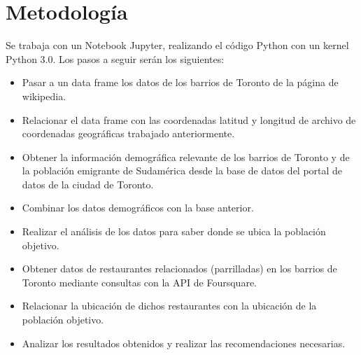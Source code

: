 \documentclass[11pt,a4paper,sans, spanish]{article}
\begin{document}
\section{Metodología}
Se trabaja con un Notebook Jupyter, realizando el código Python con un kernel Python 3.0.
Los pasos a seguir serán los siguientes:
\begin{itemize}
	\item Pasar a un data frame los datos de los barrios de Toronto de la página de wikipedia.
	\item Relacionar el data frame con las coordenadas latitud y longitud de archivo de coordenadas geográficas trabajado anteriormente.
	\item Obtener la información demográfica relevante de los barrios de Toronto y de la población emigrante de Sudamérica  desde  la base de datos del portal de datos de la ciudad de Toronto.
	\item Combinar los datos demográficos con la base anterior.
	\item Realizar el análisis de los datos para saber donde se ubica la población objetivo.
	\item Obtener datos de restaurantes relacionados (parrilladas) en los barrios de Toronto mediante consultas con la API de Foursquare.
	\item Relacionar la ubicación de dichos restaurantes con la ubicación de la población objetivo.
	\item Analizar los resultados obtenidos y realizar las recomendaciones necesarias.   
\end{itemize}



  
\end{document}
